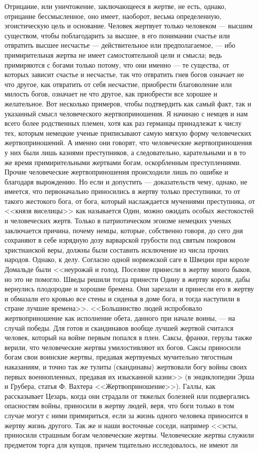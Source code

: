 \documentclass[12pt]{article}
\begin{document}
Отрицание, или уничтожение, заключающееся в жертве, не есть, однако, отрицание бессмысленное, оно имеет, наоборот, весьма определенную, эгоистическую цель и основание. Человек жертвует только человеком --- высшим существом, чтобы поблагодарить за высшее, в его понимании счастье или отвратить высшее несчастье --- действительное или предполагаемое, --- ибо примирительная жертва не имеет самостоятельной цели и смысла; ведь примиряются с богами только потому, что они именно --- те существа, от которых зависит счастье и несчастье, так что отвратить гнев богов означает не что другое, как отвратить от себя несчастие, приобрести благоволение или милость богов, означает не что другое, как приобрести все хорошее и желательное. Вот несколько примеров, чтобы подтвердить как самый факт, так и указанный смысл человеческого жертвоприношения. Я начинаю с немцев и нам всего более родственных племен, хотя как раз германцы принадлежат к числу тех, которым немецкие ученые приписывают самую мягкую форму человеческих жертвоприношений. А именно они говорят, что человеческие жертвоприношения у них были лишь казнями преступников, а следовательно, карательными и в то же время примирительными жертвами богам, оскорбленным преступлениями. Прочие человеческие жертвоприношения происходили лишь по ошибке и благодаря вырождению. Но если и допустить --- доказательств чему, однако, не имеется, что первоначально приносились в жертву только преступники, то от такого жестокого бога, от бога, который наслаждается мучениями преступника, от <<князя виселицы>>  как называется Один, можно ожидать особых жестокостей и человеческих жертв. Только в патриотическом эгоизме немецких ученых заключается причина, почему немцы, которые, собственно говоря, до сего дня сохраняют в себе изрядную дозу варварской грубости под святым покровом христианской веры, должны были составить исключение из числа прочих народов. Однако, к делу. Согласно одной норвежской саге в Швеции при короле Домальде были <<неурожай и голод. Поселяне принесли в жертву много быков, но это не помогло. Шведы решили тогда принести Одину в жертву короля, дабы вернулись плодородие и хорошие бремена. Они зарезали и принесли его в жертву и обмазали его кровью все стены и сиденья в доме бога, и тогда наступили в стране лучшие времена>>. <<Большинство людей испробовало жертвоприношение как исполнение обета, данного при начале воины, --- на случай победы. Для готов и скандинавов вообще лучшей жертвой считался человек, который на войне первым попался в плен. Саксы, франки, герулы также верили, что человеческие жертвы умилостивляют их богов. Саксы приносили богам свои воинские жертвы, предавая жертвуемых мучительно тягостным наказаниям, и точно так же тулиты (скандинавы) жертвовали богу войны своих первых военнопленных, предавая их изысканной казни>> (в энциклопедии Эрша и Грубера, статья Ф. Вахтера <<Жертвоприношение>>). Галлы, как рассказывает Цезарь, когда они страдали от тяжелых болезней или подвергались опасностям войны, приносили в жертву людей, веря, что боги только в том случае могут с ними примириться, если за жизнь одного человека приносится в жертву жизнь другого. Так же и наши восточные соседи, например <<эсты, приносили страшным богам человеческие жертвы. Человеческие жертвы служили предметом торга для купцов, причем тщательно исследовалось, не имеют ли 
\end{document}
